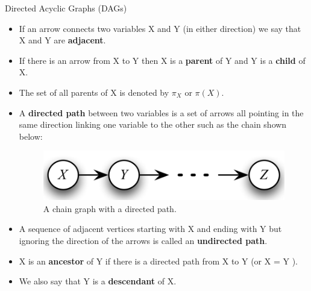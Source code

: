 \documentclass[handout]{beamer}
\begin{document}
\begin{frame}{Directed Acyclic Graphs (DAGs)}
\scriptsize{
\begin{itemize}
\item If an arrow connects two variables X and Y (in either direction) we say that X and Y are \textbf{adjacent}.


\item If there is an arrow from X to Y then X is a \textbf{parent} of Y and Y is a \textbf{child} of X.

\item The set of all parents of X is denoted by $\pi_{X}$ or $\pi(X)$.

\item A \textbf{directed path} between two variables is a set of arrows all pointing in the same direction linking one variable to the other such as the chain shown below:

\begin{figure}[h!]
	\centering
	\includegraphics[scale=0.5]{pics/dag2.png}
	\caption{A chain graph with a directed path.}
	\end{figure} 

\item A sequence of adjacent vertices starting with X and ending with Y but ignoring the
direction of the arrows is called an \textbf{undirected path}.
	
\item X is an \textbf{ancestor} of Y if there is a directed path from X to Y (or X = Y ).

\item We also say that Y is a \textbf{descendant} of X.
 
\end{itemize}



} 

\end{frame}
\end{document}
